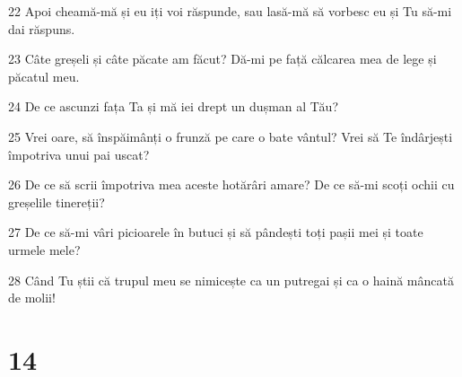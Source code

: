 \par 22 Apoi cheamă-mă și eu iți voi răspunde, sau lasă-mă să vorbesc eu și Tu să-mi dai răspuns.
\par 23 Câte greșeli și câte păcate am făcut? Dă-mi pe față călcarea mea de lege și păcatul meu.
\par 24 De ce ascunzi fața Ta și mă iei drept un dușman al Tău?
\par 25 Vrei oare, să înspăimânți o frunză pe care o bate vântul? Vrei să Te îndârjești împotriva unui pai uscat?
\par 26 De ce să scrii împotriva mea aceste hotărâri amare? De ce să-mi scoți ochii cu greșelile tinereții?
\par 27 De ce să-mi vâri picioarele în butuci și să pândești toți pașii mei și toate urmele mele?
\par 28 Când Tu știi că trupul meu se nimicește ca un putregai și ca o haină mâncată de molii!

\chapter{14}


